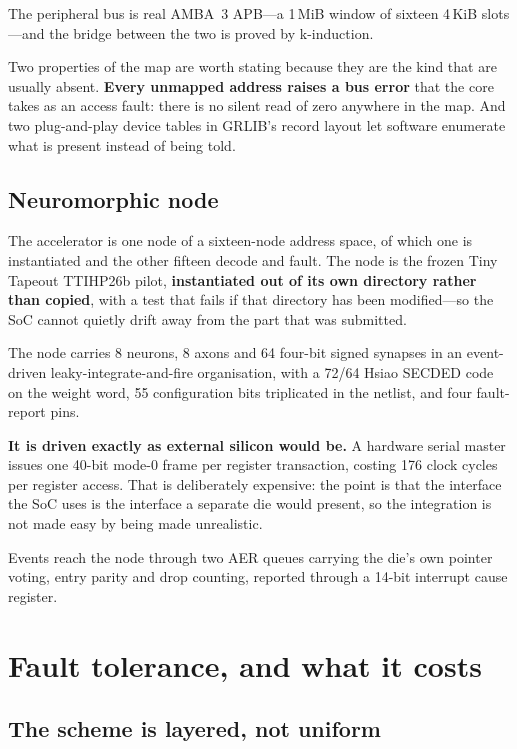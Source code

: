 \documentclass[11pt,a4paper]{article}
\begin{document}
The peripheral bus is real AMBA~3 APB---a \num{1}\,MiB window of sixteen
\num{4}\,KiB slots---and the bridge between the two is proved by
k-induction.

Two properties of the map are worth stating because they are the kind
that are usually absent. \textbf{Every unmapped address raises a bus
error} that the core takes as an access fault: there is no silent read
of zero anywhere in the map. And two plug-and-play device tables in
GRLIB's record layout let software enumerate what is present instead of
being told.

\subsection{Neuromorphic node}

The accelerator is one node of a sixteen-node address space, of which
one is instantiated and the other fifteen decode and fault. The node is
the frozen Tiny Tapeout TTIHP26b pilot, \textbf{instantiated out of its
own directory rather than copied}, with a test that fails if that
directory has been modified---so the SoC cannot quietly drift away from
the part that was submitted.

The node carries \num{8} neurons, \num{8} axons and \num{64} four-bit
signed synapses in an event-driven leaky-integrate-and-fire
organisation, with a \num{72}/\num{64} Hsiao SECDED code on the weight
word, \num{55} configuration bits triplicated in the netlist, and four
fault-report pins.

\textbf{It is driven exactly as external silicon would be.} A hardware
serial master issues one \num{40}-bit mode-0 frame per register
transaction, costing \num{176} clock cycles per register access. That is
deliberately expensive: the point is that the interface the SoC uses is
the interface a separate die would present, so the integration is not
made easy by being made unrealistic.

Events reach the node through two AER queues carrying the die's own
pointer voting, entry parity and drop counting, reported through a
\num{14}-bit interrupt cause register.

\section{Fault tolerance, and what it costs}
\label{sec:protect}

\subsection{The scheme is layered, not uniform}
\end{document}
